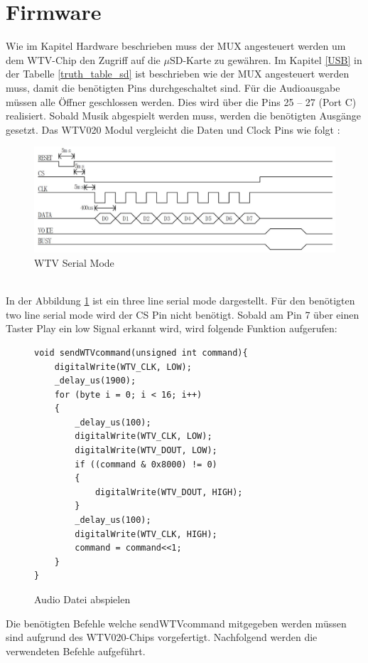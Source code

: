 \section{Firmware}
Wie im Kapitel Hardware beschrieben muss der MUX angesteuert werden um dem WTV-Chip den Zugriff auf die $\mu$SD-Karte zu gewähren. Im Kapitel \ref{USB} in der Tabelle \ref{truth_table_sd} ist beschrieben wie der MUX angesteuert werden muss, damit die benötigten Pins durchgeschaltet sind.
Für die Audioausgabe müssen alle Öffner geschlossen werden. Dies wird über die Pins 25 – 27 (Port C) realisiert. Sobald Musik abgespielt werden muss, werden die benötigten Ausgänge gesetzt. Das  WTV020 Modul vergleicht die Daten und Clock Pins wie folgt :
\begin{figure}[h]
	\centering
	\includegraphics[width=15cm]{Bilder/WTV-Serial-Mode.JPG}
	\caption{WTV Serial Mode}
	\label{WTV-Serial}
\end{figure}\\
In der Abbildung \ref{WTV-Serial} ist ein three line serial mode dargestellt. Für den benötigten two line serial mode wird der CS Pin nicht benötigt.
\newpage
Sobald am Pin 7 über einen Taster Play ein low Signal erkannt wird, wird folgende Funktion aufgerufen:

\begin{figure}[h]
	\begin{verbatim}
void sendWTVcommand(unsigned int command){
	digitalWrite(WTV_CLK, LOW);
	_delay_us(1900);
	for (byte i = 0; i < 16; i++)
	{
		_delay_us(100);
		digitalWrite(WTV_CLK, LOW);
		digitalWrite(WTV_DOUT, LOW);
		if ((command & 0x8000) != 0)
		{
			digitalWrite(WTV_DOUT, HIGH);
		}
		_delay_us(100);
		digitalWrite(WTV_CLK, HIGH);
		command = command<<1;
	}
}
	\end{verbatim}
	\caption{Audio Datei abspielen \cite{WTVCODE}}
	\label{WTV-Play}
\end{figure}


Die benötigten Befehle welche sendWTVcommand mitgegeben werden müssen sind aufgrund des WTV020-Chips vorgefertigt.
Nachfolgend werden die verwendeten Befehle aufgeführt.\\

